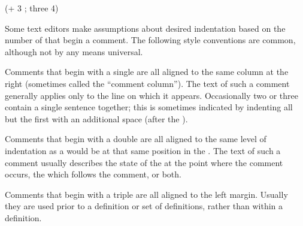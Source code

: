 
\code
 (+ 3 ; three
    4)
\endcode

\endsubsubsection%


Some text editors make assumptions about desired indentation based on
the number of  that begin a comment.  The following style 
conventions are common, although not by any means universal.  



Comments that begin with a single  are all aligned to 
the same column at the right (sometimes called the ``comment column'').
The text of such a comment generally applies only to the line on which it appears.
Occasionally two or three contain a single sentence together;
this is sometimes indicated by indenting all but the first with an additional
space (after the ).

\endsubsubsubsection%



Comments that begin with a double  are all aligned to
the same level of indentation as a  would be at that same
position in the .
The text of such a comment usually describes
    the state of the  at the point where the comment occurs,
    the  which follows the comment,
 or both.

\endsubsubsubsection%



Comments that begin with a triple  are all aligned to
the left margin.  Usually they are used prior to a definition or set
of definitions, rather than within a definition.

\endsubsubsubsection%



